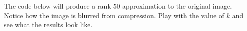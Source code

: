 The code below will produce a rank 50 approximation to the original image. Notice how the image is blurred from compression. Play with the value of $k$ and see what the results look like.
